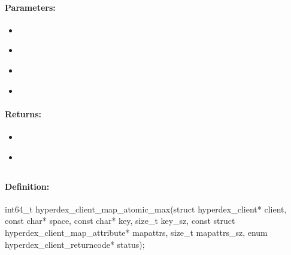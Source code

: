 \paragraph{Parameters:}
\begin{itemize}[noitemsep]
\item {}\\

\item {}\\

\item {}\\

\item {}\\

\end{itemize}

\paragraph{Returns:}
\begin{itemize}[noitemsep]
\item {}\\

\item {}\\

\end{itemize}

\pagebreak
\subsection{}
\label{api:c:map_atomic_max}


\paragraph{Definition:}
\begin{ccode}
int64_t hyperdex_client_map_atomic_max(struct hyperdex_client* client,
        const char* space,
        const char* key, size_t key_sz,
        const struct hyperdex_client_map_attribute* mapattrs, size_t mapattrs_sz,
        enum hyperdex_client_returncode* status);
\end{ccode}

